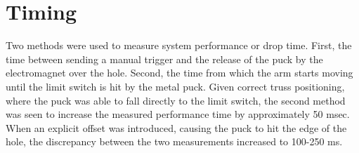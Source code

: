 \section{Timing}
\label{sec:Timing}

Two methods were used to measure system performance or drop time.
First, the time between sending a manual trigger and the release of the puck by the electromagnet over the hole.
Second, the time from which the arm starts moving until the limit switch is hit by the metal puck. 
Given correct truss positioning, where the puck was able to fall directly to the limit switch, the second method was seen to increase the measured performance time by approximately 50 msec. 
When an explicit offset was introduced, causing the puck to hit the edge of the hole, the discrepancy between the two measurements increased to 100-250 ms.



